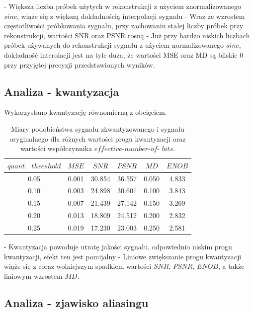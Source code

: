 \documentclass{article}
\begin{document}
- Większa liczba próbek użytych w rekonstrukcji z użyciem znormalizowanego $sinc$, wiąże się z większą dokładnością interpolacji sygnału
\newline
\indent- Wraz ze wzrostem częstotliwości próbkowania sygnału, przy zachowaniu stałej liczby próbek przy rekonstrukcji, wartości SNR oraz PSNR rosną
\newline
\indent- Już przy bardzo niskich liczbach próbek używanych do rekonstrukcji sygnału z użyciem normalizowanego $sinc$, dokładność interolacji jest na tyle duża, że wartości MSE oraz MD są bliskie 0 przy przyjętej precyzji przedstawionych wyników.

\subsection{Analiza - kwantyzacja}
Wykorzystano kwantyzację równomierną z obcięciem.
\begin{table}[H]
\centering
\begin{tabular}{|c | c | c | c | c | c|}
 \hline
 $quant.\text{ }threshold$ & $MSE$ & $SNR$ & $PSNR$ & $MD$ & $ENOB$\\
 \hline
 0.05 & 0.001 & 30.854 & 36.557 & 0.050 & 4.833 \\
 \hline
 0.10 & 0.003 & 24.898 & 30.601 & 0.100 & 3.843 \\
 \hline
 0.15 & 0.007 & 21.439 & 27.142 & 0.150 & 3.269 \\
 \hline
 0.20 & 0.013 & 18.809 & 24.512 & 0.200 & 2.832 \\
 \hline
 0.25 & 0.019 & 17.230 & 23.003 & 0.250 & 2.581 \\
 \hline
\end{tabular}
\caption{Miary podobieństwa sygnału zkwantyzowanego i sygnału oryginalnego dla różnych wartości progu kwantyzacji oraz wartości współczynnika $effective$-$number$-$of$- $bits$. }
\label{table:quant}
\end{table}

- Kwantyzacja powoduje utratę jakości sygnału, odpowiednio niskim progu kwantyzacji, efekt ten jest pomijalny
\newline
\indent- Liniowe zwiększanie progu kwantyzacji wiąże się z coraz wolniejszym spadkiem wartości $SNR$, $PSNR$, $ENOB$, a także liniowym wzrostem $MD$. 

\subsection{Analiza - zjawisko aliasingu}
\end{document}
